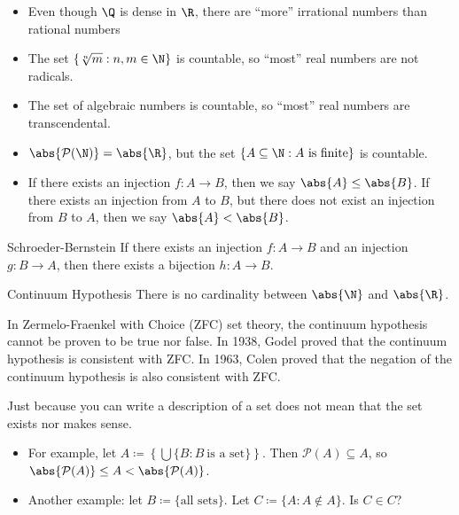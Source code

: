 \begin{itemize}
    \item Even though $\Q$ is dense in $\R$, there are ``more'' irrational numbers than rational numbers
    \item The set $\{\sqrt[n]{m} : n,m \in \N\}$ is countable, so ``most'' real numbers are not radicals.
    \item The set of algebraic numbers is countable, so ``most'' real numbers are transcendental.
    \item $\abs{\mathcal{P}(\N)} = \abs{\R}$, but the set $\{ A \subseteq \N : A\ \text{is finite} \}$ is countable.
    \item If there exists an injection $f : A \to B$, then we say $\abs{A} \leq \abs{B}$. If there exists an injection from $A$ to $B$, but there does not exist an injection from $B$ to $A$, then we say $\abs{A} < \abs{B}$.
\end{itemize}

\begin{thmbox}{Schroeder-Bernstein}{}
    If there exists an injection $f : A \to B$ and an injection $g : B \to A$, then there exists a bijection $h : A \to B$.
\end{thmbox}

\begin{thmbox}{Continuum Hypothesis}{}
    There is no cardinality between $\abs{\N}$ and $\abs{\R}$.
\end{thmbox}

In Zermelo-Fraenkel with Choice (ZFC) set theory, the continuum hypothesis cannot be proven to be true nor false. In 1938, Godel proved that the continuum hypothesis is consistent with ZFC. In 1963, Colen proved that the negation of the continuum hypothesis is also consistent with ZFC.

\begin{notebox}
    Just because you can write a description of a set does not mean that the set exists nor makes sense.
    \begin{itemize}
        \item For example, let $A \coloneq \left\{ \bigcup \{ B : B\ \text{is a set} \} \right\}$. Then $\mathcal{P}(A) \subseteq A$, so $\abs{\mathcal{P}(A)} \leq A < \abs{\mathcal{P}(A)}$.
        \item Another example: let $B \coloneq \{\text{all sets}\}$. Let $C \coloneq \{ A : A \notin A \}$. Is $C \in C$?
    \end{itemize}
\end{notebox}
